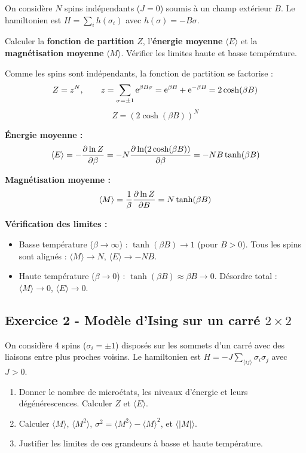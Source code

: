 \documentclass[12pt,a4paper]{article}
\begin{document}
\begin{boiteexercice}
On considère $N$ spins indépendants ($J=0$) soumis à un champ extérieur $B$. Le hamiltonien est $H = \sum_i h(\sigma_i)$ avec $h(\sigma) = -B\sigma$.

Calculer la \textbf{fonction de partition} $Z$, l'\textbf{énergie moyenne} $\langle E\rangle$ et la \textbf{magnétisation moyenne} $\langle M\rangle$. Vérifier les limites haute et basse température.
\end{boiteexercice}

\begin{boitecorrige}
Comme les spins sont indépendants, la fonction de partition se factorise :
\[
Z = z^N, \qquad z = \sum_{\sigma=\pm1}\mathrm{e}^{\beta B\sigma} = \mathrm{e}^{\beta B} + \mathrm{e}^{-\beta B} = 2\cosh(\beta B)
\]
\[
\boxed{Z = \left(2\cosh(\beta B)\right)^N}
\]

\textbf{Énergie moyenne :}
\[
\langle E\rangle = -\dfrac{\partial \ln Z}{\partial \beta} = -N\dfrac{\partial \ln(2\cosh(\beta B))}{\partial \beta} = -NB\tanh(\beta B)
\]

\textbf{Magnétisation moyenne :}
\[
\langle M\rangle = \frac{1}{\beta}\dfrac{\partial \ln Z}{\partial B} = N\tanh(\beta B)
\]

\textbf{Vérification des limites :}
\begin{itemize}
  \item Basse température ($\beta\to\infty$) : $\tanh(\beta B)\to 1$ (pour $B>0$). Tous les spins sont alignés : $\langle M\rangle\to N$, $\langle E\rangle\to -NB$.
  \item Haute température ($\beta\to 0$) : $\tanh(\beta B)\approx\beta B\to 0$. Désordre total : $\langle M\rangle\to 0$, $\langle E\rangle\to 0$.
\end{itemize}
\end{boitecorrige}

\subsection*{Exercice 2 - Modèle d'Ising sur un carré $2\times2$ \niveau{\difficile}}

\begin{boiteexercice}
On considère 4 spins ($\sigma_i = \pm1$) disposés sur les sommets d'un carré avec des liaisons entre plus proches voisins. Le hamiltonien est $H = -J\sum_{\langle ij\rangle}\sigma_i\sigma_j$ avec $J>0$.

\begin{enumerate}
  \item Donner le nombre de microétats, les niveaux d'énergie et leurs dégénérescences. Calculer $Z$ et $\langle E\rangle$.
  \item Calculer $\langle M\rangle$, $\langle M^2\rangle$, $\sigma^2 = \langle M^2\rangle - \langle M\rangle^2$, et $\langle|M|\rangle$.
  \item Justifier les limites de ces grandeurs à basse et haute température.
\end{enumerate}
\end{boiteexercice}
\end{document}
